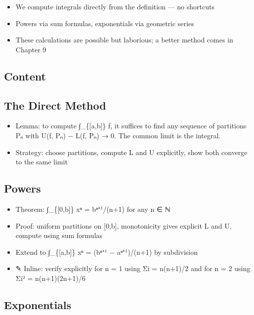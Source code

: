 \documentclass[
  10pt,
  letterpaper,
]{scrbook}
\providecommand{\tightlist}{%
  \setlength{\itemsep}{0pt}\setlength{\parskip}{0pt}}
\begin{document}
\begin{itemize}
\tightlist
\item
  We compute integrals directly from the definition --- no shortcuts
\item
  Powers via sum formulas, exponentials via geometric series
\item
  These calculations are possible but laborious; a better method comes
  in Chapter 9
\end{itemize}

\subsection{Content}\label{content-37}

\subsection{The Direct Method}\label{the-direct-method}

\begin{itemize}
\tightlist
\item
  Lemma: to compute ∫\_\{{[}a,b{]}\} f, it suffices to find any sequence
  of partitions Pₙ with U(f, Pₙ) − L(f, Pₙ) → 0. The common limit is the
  integral.
\item
  Strategy: choose partitions, compute L and U explicitly, show both
  converge to the same limit
\end{itemize}

\subsection{Powers}\label{powers}

\begin{itemize}
\tightlist
\item
  Theorem: ∫\_\{{[}0,b{]}\} xⁿ = bⁿ⁺¹/(n+1) for any n ∈ ℕ
\item
  Proof: uniform partitions on {[}0,b{]}, monotonicity gives explicit L
  and U, compute using sum formulas
\item
  Extend to ∫\_\{{[}a,b{]}\} xⁿ = (bⁿ⁺¹ − aⁿ⁺¹)/(n+1) by subdivision
\item
  ✎ Inline: verify explicitly for n = 1 using Σi = n(n+1)/2 and for n =
  2 using Σi² = n(n+1)(2n+1)/6
\end{itemize}

\subsection{Exponentials}\label{exponentials}
\end{document}
